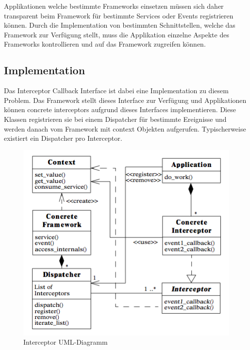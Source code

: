 Applikationen welche bestimmte Frameworks einsetzen müssen sich daher transparent beim Framework für bestimmte Services oder Events registrieren können. Durch die Implementation von bestimmten Schnittstellen, welche das Framework zur Verfügung stellt, muss die Applikation einzelne Aspekte des Frameworks kontrollieren und auf das Framework zugreifen können.


\subsection*{Implementation}

Das Interceptor Callback Interface ist dabei eine Implementation zu diesem Problem. Das Framework stellt dieses Interface zur Verfügung und Applikationen können concrete interceptors aufgrund dieses Interfaces implementieren. Diese Klassen registrieren sie bei einem Dispatcher für bestimmte Ereignisse und werden danach vom Framework mit context Objekten aufgerufen.
Typischerweise existiert ein Dispatcher pro Interceptor.

\begin{figure}[H]
	\centering
	\includegraphics[width=12cm]{content/posa2/interceptor/images/uml-diagram.png}
	\caption{Interceptor UML-Diagramm}
\end{figure}


